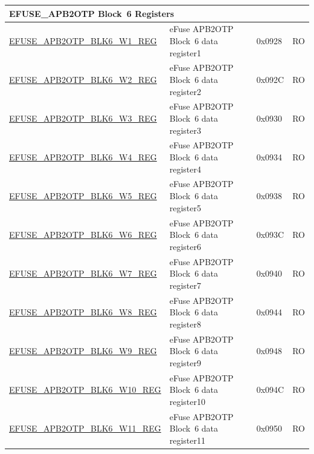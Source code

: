 \begin{longtable}{ | p{7cm} | p{6cm} | p{1.2cm} | p{1.5cm} | }
\multicolumn{4}{|l|}{\textbf{EFUSE\_APB2OTP Block~6 Registers}} \\ \hline
\hyperref[regdesc:EFUSEAPB2OTPBLK6WNREG]{EFUSE\_APB2OTP\_BLK6\_W1\_REG} & eFuse APB2OTP Block~6 data register1 & 0x0928 & RO \\\hline
\hyperref[regdesc:EFUSEAPB2OTPBLK6WNREG]{EFUSE\_APB2OTP\_BLK6\_W2\_REG} & eFuse APB2OTP Block~6 data register2 & 0x092C & RO \\\hline
\hyperref[regdesc:EFUSEAPB2OTPBLK6WNREG]{EFUSE\_APB2OTP\_BLK6\_W3\_REG} & eFuse APB2OTP Block~6 data register3 & 0x0930 & RO \\\hline
\hyperref[regdesc:EFUSEAPB2OTPBLK6WNREG]{EFUSE\_APB2OTP\_BLK6\_W4\_REG} & eFuse APB2OTP Block~6 data register4 & 0x0934 & RO \\\hline
\hyperref[regdesc:EFUSEAPB2OTPBLK6WNREG]{EFUSE\_APB2OTP\_BLK6\_W5\_REG} & eFuse APB2OTP Block~6 data register5 & 0x0938 & RO \\\hline
\hyperref[regdesc:EFUSEAPB2OTPBLK6WNREG]{EFUSE\_APB2OTP\_BLK6\_W6\_REG} & eFuse APB2OTP Block~6 data register6 & 0x093C & RO \\\hline
\hyperref[regdesc:EFUSEAPB2OTPBLK6WNREG]{EFUSE\_APB2OTP\_BLK6\_W7\_REG} & eFuse APB2OTP Block~6 data register7 & 0x0940 & RO \\\hline
\hyperref[regdesc:EFUSEAPB2OTPBLK6WNREG]{EFUSE\_APB2OTP\_BLK6\_W8\_REG} & eFuse APB2OTP Block~6 data register8 & 0x0944 & RO \\\hline
\hyperref[regdesc:EFUSEAPB2OTPBLK6WNREG]{EFUSE\_APB2OTP\_BLK6\_W9\_REG} & eFuse APB2OTP Block~6 data register9 & 0x0948 & RO \\\hline
\hyperref[regdesc:EFUSEAPB2OTPBLK6WNREG]{EFUSE\_APB2OTP\_BLK6\_W10\_REG} & eFuse APB2OTP Block~6 data register10 & 0x094C & RO \\\hline
\hyperref[regdesc:EFUSEAPB2OTPBLK6WNREG]{EFUSE\_APB2OTP\_BLK6\_W11\_REG} & eFuse APB2OTP Block~6 data register11 & 0x0950 & RO \\\hline


\end{longtable}
